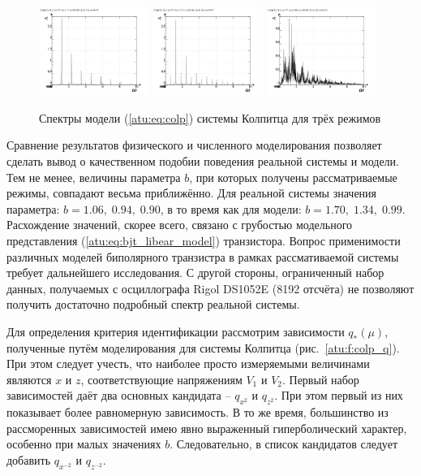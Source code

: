 \begin{figure}[htb!]
 \centerline{
   \includegraphics[width=0.32\textwidth]{p/cha/colp/colp_f-p_f_b=1x70.png}
   \includegraphics[width=0.32\textwidth]{p/cha/colp/colp_f-p_f_b=1x37.png}
   \includegraphics[width=0.32\textwidth]{p/cha/colp/colp_f-p_f_b=0x99.png}
 }
  \caption{Спектры модели (\ref{atu:eq:colp}) системы Колпитца для трёх режимов}
  \label{atu:f:colp_model_f}
\end{figure}

Сравнение результатов физического и численного моделирования позволяет сделать вывод
о качественном подобии поведения реальной системы и модели.
Тем не менее, величины параметра $b$, при которых получены
рассматриваемые режимы, совпадают весьма приближённо.
Для реальной системы значения параметра: $b = 1.06, \; 0.94, \; 0.90 $, в то время как
для модели: $b = 1.70, \; 1.34, \; 0.99 $.
Расхождение значений, скорее всего, связано с грубостью модельного представления (\ref{atu:eq:bjt_libear_model}) транзистора.
Вопрос применимости различных моделей биполярного транзистра в рамках рассмативаемой системы
требует дальнейшего исследования.
С другой стороны, ограниченный набор данных, получаемых с осциллографа Rigol DS1052E (8192 отсчёта) не позволяют
получить достаточно подробный спектр реальной системы.

Для определения критерия идентификации рассмотрим зависимости
$q_{*}(\mu) $, полученные путём моделирования
для системы Колпитца (рис.~\ref{atu:f:colp_q}).
При этом следует учесть, что наиболее просто измеряемыми величинами являются $x$ и $z$,
соответствующие напряжениям $V_1$ и $V_2$.
Первый набор зависимостей даёт два основных кандидата -- $q_{x^2}$ и $q_{z^2}$.
При этом первый из них показывает более равномерную зависимость.
В то же время, большинство из рассморенных зависимостей имею явно
выраженный гиперболический характер, особенно при малых значениях $b$.
Следовательно, в список кандидатов следует добавить $q_{x^{-2}} $ и $q_{z^{-2}}$.


